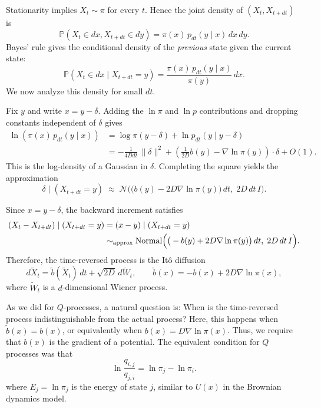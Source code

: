 \documentclass[11pt]{article}
\begin{document}
Stationarity implies $X_t\sim \pi$ for every $t$. Hence the joint density of $(X_t,X_{t+dt})$ is
\begin{equation}
\mathbb P(X_t\in dx, X_{t+dt}\in dy)
=
\pi(x)\,p_{dt}(y\mid x)\,dx\,dy.
\end{equation}
Bayes' rule gives the conditional density of the \emph{previous} state given the current state:
\begin{equation}
\mathbb P(X_t\in dx \mid X_{t+dt}=y)
=
\frac{\pi(x)\,p_{dt}(y\mid x)}{\pi(y)}\,dx.
\end{equation}
We now analyze this density for small $dt$.


Fix $y$ and write $x=y-\delta$. 
Adding the $\ln\pi$ and $\ln p$ contributions and dropping constants independent of $\delta$ gives
\begin{align}
\ln( \pi(x)\,p_{dt}(y\mid x)) &= \log\pi(y-\delta)+\ln p_{dt}(y\mid y-\delta)\\
&=
-\frac{1}{4Ddt}\,\|\delta\|^2
+\left(\frac{1}{2D}b(y)-\nabla\ln\pi(y)\right)\cdot \delta
+O(1).
\end{align}
This is the log-density of a Gaussian in $\delta$. Completing the square yields the approximation
\begin{equation}
\delta \mid (X_{t+dt}=y)
\;\approx\;
\mathcal N\!\Big(\big(b(y)-2D\nabla\ln\pi(y)\big)\,dt,\;2D\,dt\,I\Big).
\end{equation}

Since $x=y-\delta$, the backward increment satisfies
\begin{align}
(X_t-X_{t+dt})\mid (X_{t+dt}=y)
&=
(x-y)\mid (X_{t+dt}=y)\\
&\sim_{\text{approx}}  
\mathcal {\rm Normal}\Big(\big(-b(y)+2D\nabla\ln\pi(y)\big)\,dt,\;2D\,dt\,I\Big).
\end{align}
Therefore, the time-reversed process is the It\^o diffusion
\begin{equation}
d\tilde X_t
=
\tilde b(\tilde X_t)\,dt + \sqrt{2D}\,d\tilde W_t,
\qquad
\tilde b(x) = -b(x)+2D\nabla\ln\pi(x),
\end{equation}
where $\tilde W_t$ is a $d$-dimensional Wiener process.

As we did for $Q$-processes, a natural question is: When is the time-reversed process indistinguishable from the actual process? 
Here, this happens when $\tilde{b}(x) = b(x)$, or equivalently when $b(x) = D\nabla \ln \pi(x)$. Thus, we require that $b(x)$ is the gradient of a potential. The equivalent condition for $Q$ processes was that 
\begin{equation}
\ln\frac{q_{i,j}}{q_{j,i}} = \ln \pi_j - \ln \pi_i. 
\end{equation}
where $E_j = \ln \pi_j$ is the energy of state $j$, similar to $U(x)$ in the Brownian dynamics model. 
\end{document}
